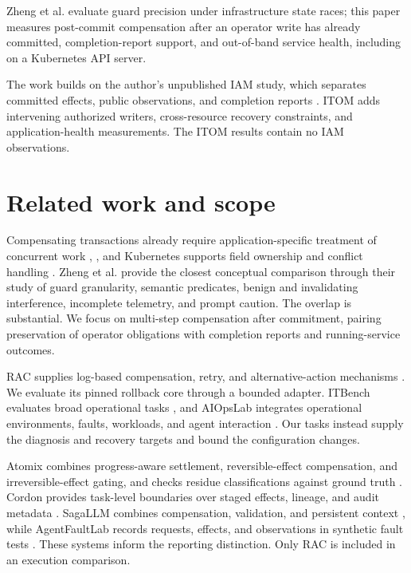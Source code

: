 \documentclass[conference,10pt]{IEEEtran}
\begin{document}
Zheng et al. \cite{ref5} evaluate guard precision under infrastructure state races; this paper measures post\hyp{}commit compensation after an operator write has already committed, completion\hyp{}report support, and out\hyp{}of\hyp{}band service health, including on a Kubernetes API server.

The work builds on the author's unpublished IAM study, which separates committed effects, public observations, and completion reports \cite{ref3}. ITOM adds intervening authorized writers, cross\hyp{}resource recovery constraints, and application\hyp{}health measurements. The ITOM results contain no IAM observations.

\section{Related work and scope}

Compensating transactions already require application\hyp{}specific treatment of concurrent work \cite{ref1}, \cite{ref13}, and Kubernetes supports field ownership and conflict handling \cite{ref2}. Zheng et al. \cite{ref5} provide the closest conceptual comparison through their study of guard granularity, semantic predicates, benign and invalidating interference, incomplete telemetry, and prompt caution. The overlap is substantial. We focus on multi\hyp{}step compensation after commitment, pairing preservation of operator obligations with completion reports and running\hyp{}service outcomes.

RAC supplies log\hyp{}based compensation, retry, and alternative\hyp{}action mechanisms \cite{ref4}. We evaluate its pinned rollback core through a bounded adapter. ITBench evaluates broad operational tasks \cite{ref6}, and AIOpsLab integrates operational environments, faults, workloads, and agent interaction \cite{ref7}. Our tasks instead supply the diagnosis and recovery targets and bound the configuration changes.

Atomix combines progress\hyp{}aware settlement, reversible\hyp{}effect compensation, and irreversible\hyp{}effect gating, and checks residue classifications against ground truth \cite{ref8}. Cordon provides task\hyp{}level boundaries over staged effects, lineage, and audit metadata \cite{ref9}. SagaLLM combines compensation, validation, and persistent context \cite{ref10}, while AgentFaultLab records requests, effects, and observations in synthetic fault tests \cite{ref11}. These systems inform the reporting distinction. Only RAC is included in an execution comparison.
\end{document}
